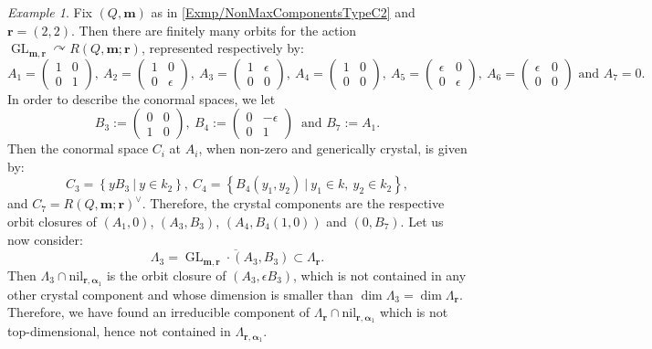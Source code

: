 \documentclass[a4paper,12pt]{article}
\theoremstyle{definition}
\theoremstyle{plain}
\theoremstyle{remark}
\newtheorem{example}[definition]{Example}
\DeclareMathOperator{\GL}{GL}
\newcommand\bfalpha{\bm{\alpha}}
\newcommand\bfm{\mathbf{m}}
\newcommand\bfr{\mathbf{r}}
\begin{document}
\begin{example}\label{Exmp/cokernelLociCrystalComponents}
Fix $(Q,\bfm)$ as in \cref{Exmp/NonMaxComponentsTypeC2} and $\bfr=(2,2)$. Then there are finitely many orbits for the action $\GL_{\bfm,\bfr}\curvearrowright R(Q,\bfm;\bfr)$, represented respectively by:
\[
A_1=(\begin{smallmatrix}1 & 0 \\ 0 & 1\end{smallmatrix}), \  A_2=(\begin{smallmatrix}1 & 0 \\ 0 & \epsilon\end{smallmatrix}), \ 
A_3=(\begin{smallmatrix}1 & \epsilon \\ 0 & 0\end{smallmatrix}), \ 
A_4=(\begin{smallmatrix}1 & 0 \\ 0 & 0\end{smallmatrix}), \ 
A_5=(\begin{smallmatrix}\epsilon & 0 \\ 0 & \epsilon\end{smallmatrix}), \ 
A_6=(\begin{smallmatrix}\epsilon & 0 \\ 0 & 0\end{smallmatrix})\text{ and } 
A_7=0.
\]
In order to describe the conormal spaces, we let
\[  B_3:=(\begin{smallmatrix}0 & 0 \\ 1 & 0\end{smallmatrix}),\ B_4:=(\begin{smallmatrix}0 & -\epsilon \\ 0 & 1\end{smallmatrix}) \  \text{ and } 
B_7 := A_1.\]
Then the conormal space $C_i$ at $A_i$, when non-zero and generically crystal, is given by:
\[
C_3=
\left\{
yB_3
\ \vert\ y\in k_2
\right\}
,\ 
C_4=
\left\{
B_4(y_1,y_2)\ \vert\ y_1\in k,\ y_2\in k_2
\right\}
,
\]
and $C_7=R(Q,\bfm;\bfr)^\vee$.
Therefore, the crystal components are the respective orbit closures of $(A_1,0)$, $(A_3,B_3)$, $(A_4,B_4(1,0))$ and $(0,B_7)$. Let us now consider:
\[
\Lambda_3=\overline{\GL_{\bfm,\bfr}\cdot (A_3,B_3)}\subset\Lambda_\bfr.
\]
Then $\Lambda_3\cap\mathrm{nil}_{\bfr,\bfalpha_1}$ is the orbit closure of $(A_3,\epsilon B_3)$, which is not contained in any other crystal component and whose dimension is smaller than $\dim\Lambda_3=\dim\Lambda_\bfr$. Therefore, we have found an irreducible component of $\Lambda_\bfr\cap\mathrm{nil}_{\bfr,\bfalpha_1}$ which is not top-dimensional, hence not contained in $\Lambda_{\bfr,\bfalpha_1}$.
\end{example}
\end{document}
